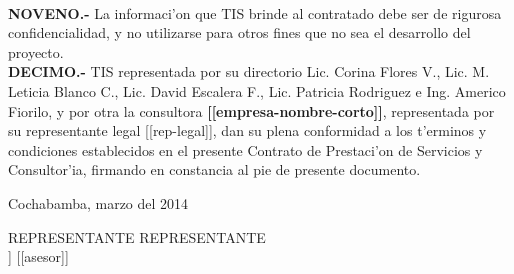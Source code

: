 \documentclass{article}
\newcommand{\fecha}[0]{marzo del 2014}
\newcommand{\empresa}[0]{\textbf{[[empresa-nombre-corto]]}}
\newcommand{\representante}[0]{[[rep-legal]]}
\begin{document}
\\
{\bf{NOVENO.-}}  La informaci'on que TIS brinde al contratado debe ser de rigurosa confidencialidad, y no utilizarse para otros fines que no sea el desarrollo del proyecto.
\\
{\bf{DECIMO.-}} TIS representada por su directorio Lic. Corina Flores V., Lic. M. Leticia Blanco C., Lic. David Escalera F., Lic. Patricia Rodriguez e Ing. Americo Fiorilo, y por otra la consultora \empresa,  representada por su representante legal \representante, dan su plena conformidad a los t'erminos y condiciones establecidos en el presente Contrato de Prestaci'on de Servicios y Consultor'ia, firmando en constancia al pie de presente documento.
\\
\begin{center}{Cochabamba, \fecha}\end{center}
\vspace{20mm}


REPRESENTANTE   \hspace*{20mm} REPRESENTANTE  \\
[[rep-legal]]  \hspace*{20mm}  [[asesor]]  \\
\end{document}
